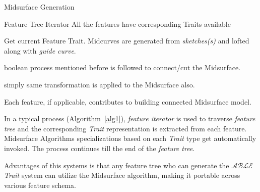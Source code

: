 \begin{algorithm}
	\caption{Midsurface Generation}
	\label{alg1}
	\begin{algorithmic}
		\REQUIRE Feature Tree Iterator
		\ENSURE All the features have corresponding Traits available

			\STATE Get current Feature Trait.
			\STATE  Midcurves are generated from {\em sketches(s)} and lofted along with {\em guide curve}.
			\ENDIF

			\STATE  boolean process mentioned before is followed to connect/cut the Midsurface.
			\ENDIF

			\STATE  simply same transformation is applied to the Midsurface also.
			\ENDIF

		\ENDWHILE
		\STATE  Each feature, if applicable, contributes to building connected Midsurface model.
	\end{algorithmic}
\end{algorithm}

In a typical process (Algorithm~\ref{alg1}), {\em feature iterator} is used to traverse {\em feature tree} and  the corresponding {\em Trait} representation is extracted from each feature. Midsurface Algorithms specializations based on each {\em Trait} type get automatically invoked. The process continues till the end of the {\em feature tree}.


Advantages of this systems is that any feature tree who can generate the  $\mathcal{ABLE}$ {\em Trait} system can utilize the Midsurface algorithm, making it portable across various feature schema.
